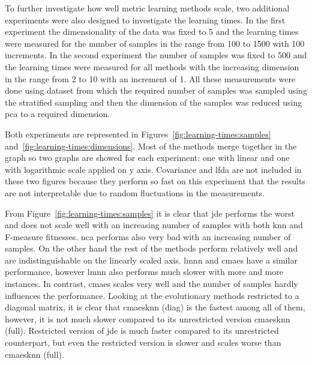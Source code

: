 

To further investigate how well metric learning methods scale, two additional experiments were also designed to investigate the learning times. In the first experiment the dimensionality of the data was fixed to 5 and the learning times were measured for the number of samples in the range from 100 to 1500 with 100 increments. In the second experiment the number of samples was fixed to 500 and the learning times were measured for all methods with the increasing dimension in the range from 2 to 10 with an increment of 1. All these measurements were done using  dataset from which the required number of samples was sampled using the stratified sampling and then the dimension of the samples was reduced using \ac{pca} to a required dimension.

Both experiments are represented in Figures~\ref{fig:learning-times:samples} and~\ref{fig:learning-times:dimensions}. Most of the methods merge together in the graph so two graphs are showed for each experiment: one with linear and one with logarithmic scale applied on y axis. Covariance and \ac{lfda} are not included in these two figures because they perform so fast on this experiment that the results are not interpretable due to random fluctuations in the measurements.

From Figure~\ref{fig:learning-times:samples} it is clear that \ac{jde} performs the worst and does not scale well with an increasing number of samples with both \ac{knn} and \mbox{F-measure} fitnesses. \ac{nca} performs also very bad with an increasing number of samples. On the other hand the rest of the methods perform relatively well and are indistinguishable on the linearly scaled axis. \ac{lmnn} and \ac{cmaes} have a similar performance, however \ac{lmnn} also performs much slower with more and more instances. In contrast, \ac{cmaes} scales very well and the number of samples hardly influences the performance. Looking at the evolutionary methods restricted to a diagonal matrix, it is clear that \ac{cmaesknn} (diag) is the fastest among all of them, however, it is not much slower compared to its unrestricted version \ac{cmaesknn} (full). Restricted version of \ac{jde} is much faster compared to its unrestricted counterpart, but even the restricted version is slower and scales worse than \ac{cmaesknn} (full).


